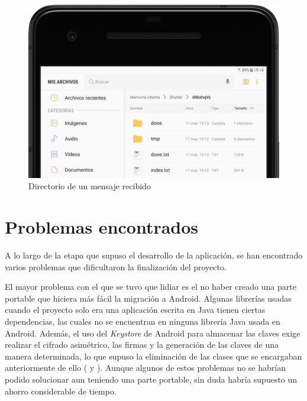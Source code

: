 \begin{figure}[!htb]
  \centering
  \includegraphics[scale=0.4]{Figures/done}
  \decoRule
  \caption[Shatter (Mensaje recibido)]{Directorio de un mensaje recibido}
  \label{fig:done}
\end{figure}


\section{Problemas encontrados}

\label{Problemas encontrados}

A lo largo de la etapa que supuso el desarrollo de la aplicación, se han encontrado varios problemas que dificultaron la finalización del proyecto.

El mayor problema con el que se tuvo que lidiar es el no haber creado una parte portable que hiciera más fácil la migración a Android. Algunas librerías usadas cuando el proyecto solo era una aplicación escrita en Java tienen ciertas dependencias, las cuales no se encuentran en ninguna librería Java usada en Android. Además, el uso del \emph{Keystore} de Android para almacenar las claves exige realizar el cifrado asimétrico, las firmas y la generación de las claves de una manera determinada, lo que supuso la eliminación de las clases que se encargaban anteriormente de ello ( y ). Aunque algunos de estos problemas no se habrían podido solucionar aun teniendo una parte portable, sin duda habría supuesto un ahorro considerable de tiempo.


